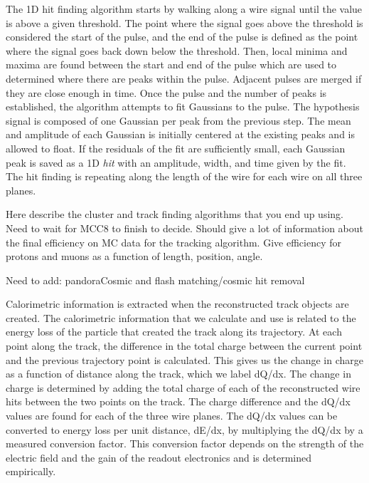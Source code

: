     The 1D hit finding algorithm starts by walking along a wire signal until
    the value is above a given threshold. The point where the signal goes above
    the threshold is considered the start of the pulse, and the end of the
    pulse is defined as the point where the signal goes back down below the
    threshold.  Then, local minima and maxima are found between the start and
    end of the pulse which are used to determined where there are peaks within
    the pulse.  Adjacent pulses are merged if they are close enough in time.
    Once the pulse and the number of peaks is established, the algorithm
    attempts to fit Gaussians to the pulse. The hypothesis signal is composed
    of one Gaussian per peak from the previous step. The mean and amplitude of
    each Gaussian is initially centered at the existing peaks and is allowed to
    float. If the residuals of the fit are sufficiently small, each Gaussian
    peak is saved as a 1D \textit{hit} with an amplitude, width, and time given
    by the fit. The hit finding is repeating along the length of the wire for
    each wire on all three planes.

    Here describe the cluster and track finding algorithms that you end up
    using. Need to wait for MCC8 to finish to decide. Should give a lot of
    information about the final efficiency on MC data for the tracking
    algorithm. Give efficiency for protons and muons as a function of length,
    position, angle.

    Need to add: pandoraCosmic and flash matching/cosmic hit removal

    Calorimetric information is extracted when the reconstructed track objects
    are created. The calorimetric information that we calculate and use is
    related to the energy loss of the particle that created the track along its
    trajectory. At each point along the track, the difference in the total
    charge between the current point and the previous trajectory point is
    calculated. This gives us the change in charge as a function of distance
    along the track, which we label dQ/dx. The change in charge is determined
    by adding the total charge of each of the reconstructed wire hits between
    the two points on the track. The charge difference and the dQ/dx values are
    found for each of the three wire planes. The dQ/dx values can be converted
    to energy loss per unit distance, dE/dx, by multiplying the dQ/dx by a
    measured conversion factor. This conversion factor depends on the strength
    of the electric field and the gain of the readout electronics and is
    determined empirically. 


